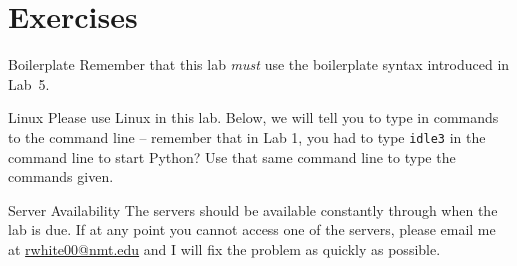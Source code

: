 \documentclass[11pt]{cselabheader}
\begin{document}
\pagebreak

\section{Exercises}
\label{sec:ex}

\begin{warningbox}{Boilerplate}
  Remember that this lab \emph{must} use the
  boilerplate syntax introduced in Lab~5.
\end{warningbox}

\begin{warningbox}{Linux}
  Please use Linux in this lab. Below, we will tell you to type in commands to
  the command line -- remember that in Lab 1, you had to type \texttt{idle3} in
  the command line to start Python? Use that same command line to type the
  commands given.
\end{warningbox}

\begin{warningbox}{Server Availability}
  The servers should be available constantly through when the lab is due. If at
  any point you cannot access one of the servers, please email me at
  \href{mailto:rwhite00@nmt.edu}{rwhite00@nmt.edu} and I will fix the problem
  as quickly as possible.
\end{warningbox}
\end{document}
